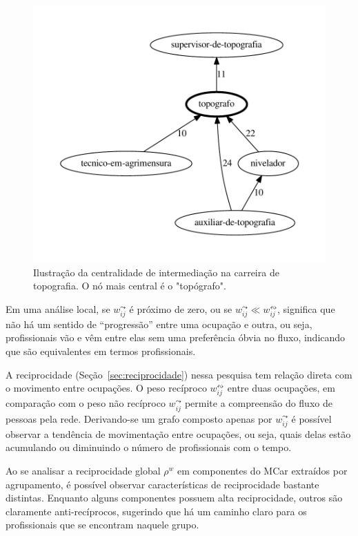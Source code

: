 \documentclass[12pt,a4paper,final]{article}
\newcommand{\weighted}[1]{#1^w} %
\newcommand{\recout}[1]{#1^\leadsto} %
\newcommand{\recboth}[1]{#1^\leftrightsquigarrow} %
\begin{document}
\begin{figure}[ht]
  \centering
  \includegraphics[scale=0.6]{cluster_25.pdf}
  \caption{Ilustração da centralidade de intermediação na carreira de topografia. O nó mais central é o "topógrafo".}
  \label{fig:carreira-topografia}
\end{figure}

\begin{hypothesis} \label{hip:equivalencia}
    Em uma análise local, se $\recout{w}_{ij}$ é próximo de zero, ou se $\recout{w}_{ij} \ll \recboth{w}_{ij}$, significa que não há um sentido de \enquote{progressão} entre uma ocupação e outra, ou seja, profissionais vão e vêm entre elas sem uma preferência óbvia no fluxo, indicando que são equivalentes em termos profissionais.
\end{hypothesis}

A reciprocidade (Seção~\ref{sec:reciprocidade}) nessa pesquisa tem relação direta com o movimento entre ocupações. O peso recíproco $\recboth{w}_{ij}$ entre duas ocupações, em comparação com o peso não recíproco $\recout{w}_{ij}$ permite a compreensão do fluxo de pessoas pela rede. Derivando-se um grafo composto apenas por $\recout{w}_{ij}$ é possível observar a tendência de movimentação entre ocupações, ou seja, quais delas estão acumulando ou diminuindo o número de profissionais com o tempo.

Ao se analisar a reciprocidade global $\weighted{\rho}$ em componentes do MCar extraídos por agrupamento, é possível observar características de reciprocidade bastante distintas. Enquanto alguns componentes possuem alta reciprocidade, outros são claramente anti-recíprocos, sugerindo que há um caminho claro para os profissionais que se encontram naquele grupo.
\end{document}
